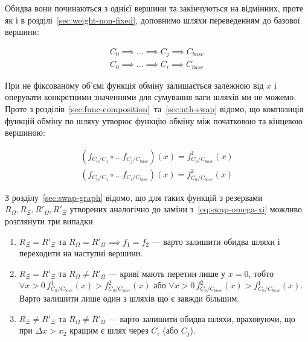 \documentclass[../index.tex]{subfiles}
\begin{document}
Обидва вони починаються з однієї вершини та закінчуються на відмінних, проте як
і в розділі~\ref{sec:weight-non-fixed}, доповнимо шляхи переведенням до базової
вершини:

\begin{equation*}
 \begin{aligned}
   C_{0} \implies \ldots \implies C_{j} \implies C_{base}\\
   C_{0} \implies \ldots \implies C_{i} \implies C_{base}
 \end{aligned}
\end{equation*}

При не фіксованому об'ємі функція обміну залишається залежною від $x$ і
оперувати конкретними значеннями для сумування ваги шляхів ми не можемо. Проте з
розділів~\ref{sec:func-composition}~та~\ref{sec:nth-swap} відомо, що композиція
функцій обміну по шляху утворює функцію обміну між початковою та кінцевою
вершиною:

\begin{equation*}
 \begin{aligned}
   (f_{C_{0}/C_{1}} \circ \ldots f_{C_{j}/C_{base}})(x) = f_{C_{0}/C_{base}}^{1}(x)\\
   (f_{C_{0}/C_{1}} \circ \ldots f_{C_{i}/C_{base}})(x) = f_{C_{0}/C_{base}}^{2}(x)
 \end{aligned}
\end{equation*}

З розділу~\ref{sec:swap-graph} відомо, що для таких функцій з резервами
$R_{\Omega}, R_{\Xi}, R'_{\Omega}, R'_{\Xi}$ утворених аналогічно до заміни
з~\eqref{eq:swap-omega-xi} можливо розглянути три випадки.

\begin{enumerate}
  \item $R_{\Xi} = R'_{\Xi}$ та $R_{\Omega} = R'_{\Omega} \implies f_{1} = f_{2}$ --- варто
		залишити обидва шляхи і переходити на наступні вершини.
  \item $R_{\Xi} = R'_{\Xi}$ та $R_{\Omega} \neq R'_{\Omega}$ --- криві мають перетин лише у
		$x = 0$, тобто
		$\forall x > 0 \, f_{C_{0}/C_{base}}^{1}(x) > f_{C_{0}/C_{base}}^{2}(x)$ або
		$\forall x > 0 \, f_{C_{0}/C_{base}}^{2}(x) > f_{C_{0}/C_{base}}^{1}(x)$. Варто
		залишити лише один з шляхів що є завжди більшим.
  \item $R_{\Xi} \neq R'_{\Xi}$ та $R_{\Omega} \neq R'_{\Omega}$ --- варто залишити обидва шляхи,
		враховуючи, що при $\Delta x > x_{2}$ кращим є шлях через $C_{i}$ (або
		$C_{j}$).
\end{enumerate}
\end{document}
